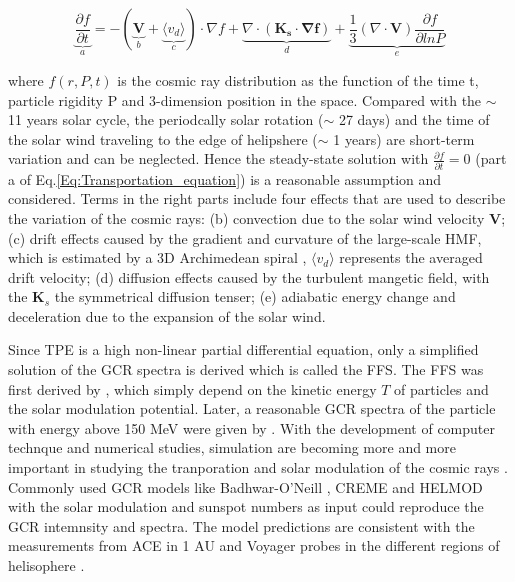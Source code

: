 	\begin{equation}
		\underbrace{\frac{\partial f}{\partial t}}_{a} = - ( \underbrace{\boldsymbol{V}}_{b} + \underbrace{\langle v_d \rangle }_{c}) \cdot \nabla f + \underbrace{\nabla \cdot (\boldsymbol{K_s \cdot \nabla f})}_{d} + \underbrace{\frac{1}{3}(\nabla \cdot \boldsymbol{V}) \frac{\partial f}{\partial ln P}}_{e}
		\label{Eq:Transportation_equation}
	\end{equation}

where $f(r, P, t)$ is the cosmic ray distribution as the function of the time t, particle rigidity P and 3-dimension position in the space. Compared with the $\sim$ 11 years solar cycle, the periodcally solar rotation ($\sim$ 27 days) and  the time of the solar wind traveling to the edge of helipshere ($\sim$ 1 years) are short-term variation and can be neglected. Hence the steady-state solution with  $\frac{\partial f}{\partial t} = 0$ (part a of Eq.\ref{Eq:Transportation_equation}) is a reasonable assumption and considered. Terms in the right parts include four effects that are used to describe the variation of the cosmic rays: (b) convection due to the solar wind velocity $\boldsymbol{V}$; (c) drift effects caused by the gradient and curvature of the large-scale \ac{HMF}, which is estimated by a 3D Archimedean spiral \citep{Parker-1958}, $\langle v_d \rangle$ represents the averaged drift velocity; (d) diffusion effects caused by the turbulent mangetic field, with the $\boldsymbol{K}_s$ the symmetrical diffusion tenser; (e) adiabatic energy change and deceleration due to the expansion of the solar wind. 

Since \ac{TPE} is a high non-linear partial differential equation, only a simplified solution of the \ac{GCR} spectra is derived which is called the \ac{FFS}. The \ac{FFS} was first derived by \citet{Gleeson1967ApJ, Gleeson1968ApJ}, which simply depend on the kinetic energy $T$ of particles and the solar modulation potential. Later, a reasonable GCR spectra of the particle with energy above 150 MeV were given by \citet{Gleeson1973ApSS}.
With the development of computer technque and numerical studies, simulation are becoming more and more important in studying the tranporation and solar modulation of the cosmic rays \citep{Jokipii1979ApJ, LeRoux1995ApJ, Manuel2011AdSpR, Potgieter2013LRSP, Vos2015ApJ, Vos2016SoPh,Boschini2019AdSpR, Boschini2022AdSpR, 
Corti2019ApJ, Shen2019ApJ}. 
Commonly used \ac{GCR} models like Badhwar-O'Neill \citep{Oneill2006AdSpR,ONeill2015, Slaba2020SpWea}, CREME \citep{Tylka1997ITNS,Weller2010ITNS} and HELMOD \citep{Boschini2018AdSpR} with the solar modulation and sunspot numbers as input could reproduce the GCR intemnsity and spectra. The model predictions are consistent with the measurements from \ac{ACE} in 1 AU and Voyager probes in the different regions of helisophere \citep{Boschini2019AdSpR}.

